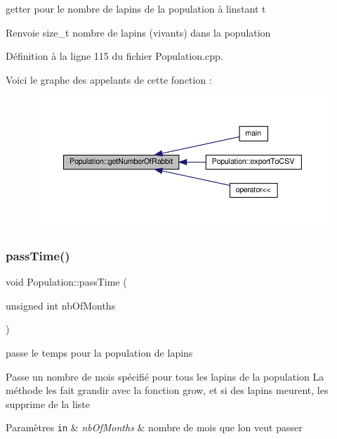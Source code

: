 getter pour le nombre de lapins de la population à l\textquotesingle{}instant t 

\begin{DoxyReturn}{Renvoie}
size\+\_\+t nombre de lapins (vivants) dans la population 
\end{DoxyReturn}


Définition à la ligne 115 du fichier Population.\+cpp.

Voici le graphe des appelants de cette fonction \+:
\nopagebreak
\begin{figure}[H]
\begin{center}
\leavevmode
\includegraphics[width=350pt]{classPopulation_a7388e8d8308abe505b7fa95c759a03ea_icgraph}
\end{center}
\end{figure}
\mbox{\label{classPopulation_a4a4eef2f12f2f46c1fafef5ca4db2933}} 
\subsubsection{\texorpdfstring{pass\+Time()}{passTime()}}
{\footnotesize\ttfamily void Population\+::pass\+Time (\begin{DoxyParamCaption}\item[{unsigned int}]{nb\+Of\+Months }\end{DoxyParamCaption})}



passe le temps pour la population de lapins 

Passe un nombre de mois spécifié pour tous les lapins de la population La méthode les fait grandir avec la fonction grow, et si des lapins meurent, les supprime de la liste


\begin{DoxyParams}[1]{Paramètres}
\mbox{\tt in}  & {\em nb\+Of\+Months} & nombre de mois que l\textquotesingle{}on veut passer \\
\hline
\end{DoxyParams}


